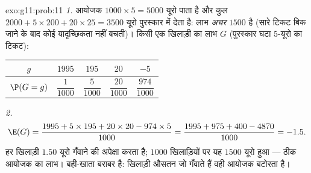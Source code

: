 \begin{solution}{exo:g11:prob:11}
\emph{1.} आयोजक $1000 \times 5 = 5000$ यूरो पाता है और कुल $2000 + 5 \times 200 + 20 \times 25 = 3500$ यूरो पुरस्कार में देता है:
लाभ \emph{अचर} $1500$ है (सारे टिकट बिक जाने के बाद कोई यादृच्छिकता नहीं
बचती)। किसी एक खिलाड़ी का लाभ $G$ (पुरस्कार घटा $5$-यूरो का टिकट):
\begin{center}
\begin{tabular}{c|cccc}
$g$ & $1995$ & $195$ & $20$ & $-5$\\
\hline\rule{0pt}{11pt}%
$\P(G=g)$ & $\dfrac{1}{1000}$ & $\dfrac{5}{1000}$ & $\dfrac{20}{1000}$
& $\dfrac{974}{1000}$
\end{tabular}
\end{center}

\emph{2.}
\[
\E(G) = \frac{1995 + 5 \times 195 + 20 \times 20 - 974 \times 5}{1000}
= \frac{1995 + 975 + 400 - 4870}{1000} = -1.5 .
\]
हर खिलाड़ी $1.50$ यूरो गँवाने की अपेक्षा करता है; $1000$ खिलाड़ियों पर यह $1500$
यूरो हुआ --- ठीक आयोजक का लाभ। बही-खाता बराबर है: खिलाड़ी औसतन जो गँवाते हैं
वही आयोजक बटोरता है।
\end{solution}

